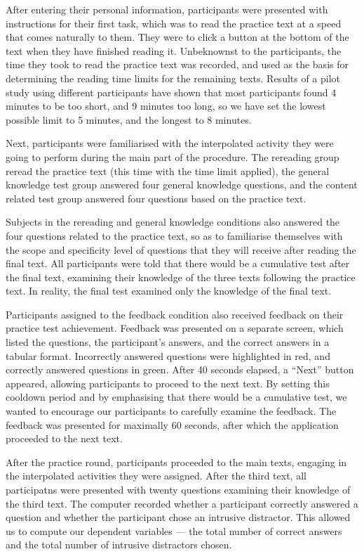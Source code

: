 \documentclass[11pt,]{article}
\begin{document}
After entering their personal information, participants were presented
with instructions for their first task, which was to read the practice
text at a speed that comes naturally to them. They were to click a
button at the bottom of the text when they have finished reading it.
Unbeknownst to the participants, the time they took to read the practice
text was recorded, and used as the basis for determining the reading
time limits for the remaining texts. Results of a pilot study using
different participants have shown that most participants found 4 minutes
to be too short, and 9 minutes too long, so we have set the lowest
possible limit to 5 minutes, and the longest to 8 minutes.

Next, participants were familiarised with the interpolated activity they
were going to perform during the main part of the procedure. The
rereading group reread the practice text (this time with the time limit
applied), the general knowledge test group answered four general
knowledge questions, and the content related test group answered four
questions based on the practice text.

Subjects in the rereading and general knowledge conditions also answered
the four questions related to the practice text, so as to familiarise
themselves with the scope and specificity level of questions that they
will receive after reading the final text. All participants were told
that there would be a cumulative test after the final text, examining
their knowledge of the three texts following the practice text. In
reality, the final test examined only the knowledge of the final text.

Participants assigned to the feedback condition also received feedback
on their practice test achievement. Feedback was presented on a separate
screen, which listed the questions, the participant's answers, and the
correct answers in a tabular format. Incorrectly answered questions were
highlighted in red, and correctly answered questions in green. After 40
seconds elapsed, a ``Next'' button appeared, allowing participants to
proceed to the next text. By setting this cooldown period and by
emphasising that there would be a cumulative test, we wanted to
encourage our participants to carefully examine the feedback. The
feedback was presented for maximally 60 seconds, after which the
application proceeded to the next text.

After the practice round, participants proceeded to the main texts,
engaging in the interpolated activities they were assigned. After the
third text, all participatns were presented with twenty questions
examining their knowledge of the third text. The computer recorded
whether a participant correctly answered a question and whether the
participant chose an intrusive distractor. This allowed us to compute
our dependent variables --- the total number of correct answers and the
total number of intrusive distractors chosen.
\end{document}
